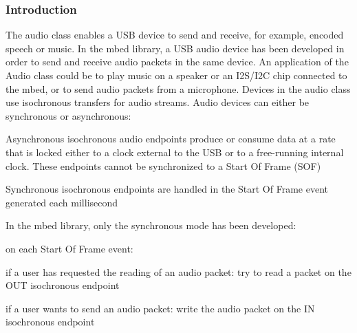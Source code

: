 \documentclass[pdftex,10pt,a4paper]{report}
\newenvironment{packed_item}{
\begin{itemize}
  \setlength{\itemsep}{1pt}
  \setlength{\parskip}{0pt}
  \setlength{\parsep}{0pt}
}{\end{itemize}}
\begin{document}
\subsubsection{Introduction}
The audio class enables a USB device to send and receive, for example, encoded speech or music. In the mbed library, a USB audio device has been developed in order to send and receive audio packets in the same device. An application of the Audio class could be to play music on a speaker or an I2S/I2C chip connected to the mbed, or to send audio packets from a microphone. Devices in the audio class use isochronous transfers for audio streams. Audio devices can either be synchronous or asynchronous:
\begin{packed_item}
	\item Asynchronous isochronous audio endpoints produce or consume data at a rate that is locked either to a
clock external to the USB or to a free-running internal clock. These endpoints cannot be synchronized to a Start Of Frame (SOF)
	\item Synchronous isochronous endpoints are handled in the Start Of Frame event generated each millisecond
\end{packed_item}
In the mbed library, only the synchronous mode has been developed:
\begin{packed_item}
	\item on each Start Of Frame event:
	\begin{packed_item}
		\item if a user has requested the reading of an audio packet: try to read a packet on the OUT isochronous endpoint
		\item if a user wants to send an audio packet: write the audio packet on the IN isochronous endpoint
	\end{packed_item}
\end{packed_item}
\end{document}
